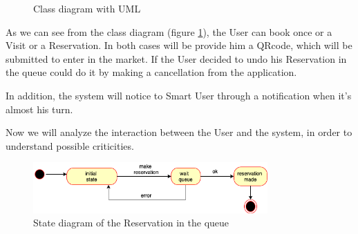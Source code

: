 \par 
\bigskip
\bigskip
\begin{figure}[H]
  \centering
  \caption{Class diagram with UML}
   \label{class_diagram}
\end{figure}



\par 
\medskip
As we can see from the class diagram (figure \ref{class_diagram}), the User can book once or a Visit or a Reservation.
In both cases will be provide him a QRcode, which will be submitted to enter in the market. 
If the User decided to undo his Reservation in the queue could do it by making a cancellation from the application. 
\par
\medskip

In addition, the system will notice to Smart User through a notification  when it's almost his turn.

Now we will analyze the interaction between the User and the system, in order to understand possible criticities.
\par 
\bigskip

\begin{figure}[h]
  \caption{State diagram of the Reservation in the queue}
  \label{fig:Reservation}
  \centering
  \includegraphics[width=0.8\textwidth, height=0.2\textwidth]{diagrams/2-reservation.png}

\end{figure}
\par 
\medskip

